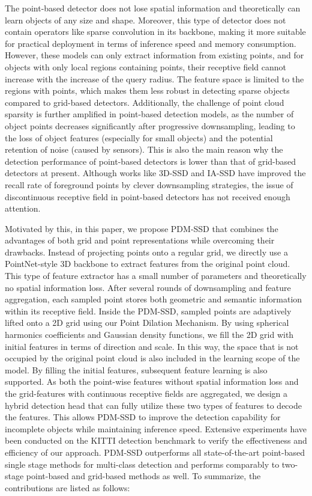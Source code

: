 The point-based detector does not lose spatial information and theoretically can learn objects of any size and shape. Moreover, this type of detector does not contain operators like sparse convolution in its backbone, making it more suitable for practical deployment in terms of inference speed and memory consumption. However, these models can only extract information from existing points, and for objects with only local regions containing points, their receptive field cannot increase with the increase of the query radius. The feature space is limited to the regions with points, which makes them less robust in detecting sparse objects compared to grid-based detectors. Additionally, the challenge of point cloud sparsity is further amplified in point-based detection models, as the number of object points decreases significantly after progressive downsampling, leading to the loss of object features (especially for small objects) and the potential retention of noise (caused by sensors). This is also the main reason why the detection performance of point-based detectors is lower than that of grid-based detectors at present. Although works like 3D-SSD \cite{yang20203dssd} and IA-SSD \cite{zhang2022not} have improved the recall rate of foreground points by clever downsampling strategies, the issue of discontinuous receptive field in point-based detectors has not received enough attention.

Motivated by this, in this paper, we propose PDM-SSD that combines the advantages of both grid and point representations while overcoming their drawbacks. Instead of projecting points onto a regular grid, we directly use a PointNet-style 3D backbone to extract features from the original point cloud. This type of feature extractor has a small number of parameters and theoretically no spatial information loss. After several rounds of downsampling and feature aggregation, each sampled point stores both geometric and semantic information within its receptive field. Inside the PDM-SSD, sampled points are adaptively lifted onto a 2D grid using our Point Dilation Mechanism. By using spherical harmonics coefficients and Gaussian density functions, we fill the 2D grid with initial features in terms of direction and scale. In this way, the space that is not occupied by the original point cloud is also included in the learning scope of the model. By filling the initial features, subsequent feature learning is also supported. As both the point-wise features without spatial information loss and the grid-features with continuous receptive fields are aggregated, we design a hybrid detection head that can fully utilize these two types of features to decode the features. This allows PDM-SSD to improve the detection capability for incomplete objects while maintaining inference speed.  Extensive experiments have been conducted on the KITTI detection benchmark to verify the effectiveness and efficiency of our approach. PDM-SSD outperforms all state-of-the-art point-based single stage methods for multi-class detection and performs comparably to two-stage point-based and grid-based methods as well. To summarize, the contributions are listed as follows:

